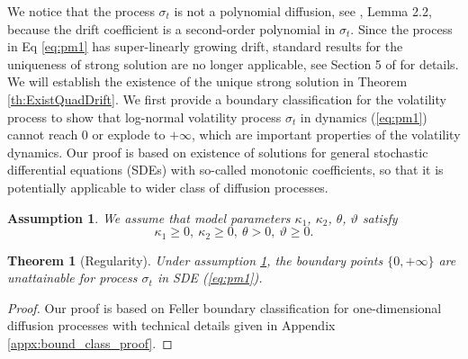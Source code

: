 \documentclass[11pt,a4paper] {article}
\newtheorem{theorem}{Theorem}[section]
\newtheorem{assumption}{Assumption}[section]
\begin{document}
We notice that the process $\sigma_t$ is not a polynomial diffusion, see \cite{Filip16}, Lemma 2.2, because the drift coefficient is a second-order polynomial in $\sigma_{t}$. Since the process in Eq \eqref{eq:pm1} has super-linearly growing drift, standard results for the uniqueness of strong solution are no longer applicable, see Section 5 of \cite{KaratzShre} for details. We will establish the existence of the unique strong solution in Theorem \ref{th:ExistQuadDrift}. 
We first provide a boundary classification for the volatility process to show that log-normal volatility process $\sigma_{t}$ in dynamics (\ref{eq:pm1}) cannot reach 0 or explode to $+\infty$, which are important properties of the volatility dynamics. Our proof is based on existence of solutions for general stochastic differential equations (SDEs) with so-called monotonic coefficients, so that it is potentially applicable to wider class of diffusion processes. 


\begin{assumption}\label{as:bound_class}
We assume that model parameters $\kappa_1$, $\kappa_2$, $\theta$, $\vartheta$ satisfy
\begin{equation}\label{eq:condExist}
\kappa_1\ge 0, \ \kappa_2\ge 0, \ \theta>0, \ \vartheta\ge 0.
\end{equation}
\end{assumption}
 
\begin{theorem}[Regularity]\label{th:bound_class}
Under assumption \ref{as:bound_class}, the boundary points $\{0, +\infty\}$ are unattainable for process $\sigma_{t}$ in SDE (\ref{eq:pm1}). 
\end{theorem}
\begin{proof}
Our proof is based on Feller boundary classification for one-dimensional diffusion processes with technical details given in Appendix \ref{appx:bound_class_proof}.
\end{proof}
\end{document}
